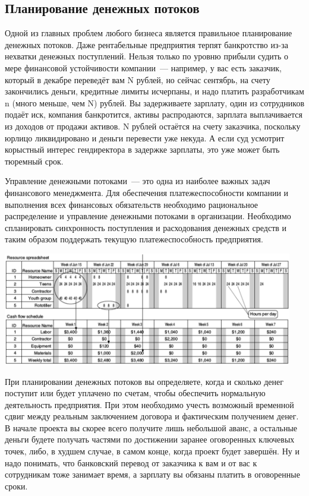 \documentclass{../../text-style}
\begin{document}
\subsection{Планирование денежных потоков}

Одной из главных проблем любого бизнеса является правильное планирование денежных потоков. Даже рентабельные предприятия терпят банкротство из-за нехватки денежных поступлений. Нельзя только по уровню прибыли судить о мере финансовой устойчивости компании~--- например, у вас есть заказчик, который в декабре переведёт вам N рублей, но сейчас сентябрь, на счету закончились деньги, кредитные лимиты исчерпаны, и надо платить разработчикам n (много меньше, чем N) рублей. Вы задерживаете зарплату, один из сотрудников подаёт иск, компания банкротится, активы распродаются, зарплата выплачивается из доходов от продажи активов. N рублей остаётся на счету заказчика, поскольку юрлицо ликвидировано и деньги перевести уже некуда. А если суд усмотрит корыстный интерес гендиректора в задержке зарплаты, это уже может быть тюремный срок.

Управление денежными потоками~--- это одна из наиболее важных задач финансового менеджмента. Для обеспечения платежеспособности компании и выполнения всех финансовых обязательств необходимо рациональное распределение и управление денежными потоками в организации. Необходимо спланировать синхронность поступления и расходования денежных средств и таким образом поддержать текущую платежеспособность предприятия.

\begin{center}
    \includegraphics[width=0.95\textwidth]{cashFlow.png}
\end{center}

При планировании денежных потоков вы определяете, когда и сколько денег поступит или будет уплачено по счетам, чтобы обеспечить нормальную деятельность предприятия. При этом необходимо учесть возможный временной сдвиг между реальным заключением договора и фактическим получением денег. В начале проекта вы скорее всего получите лишь небольшой аванс, а остальные деньги будете получать частями по достижении заранее оговоренных ключевых точек, либо, в худшем случае, в самом конце, когда проект будет завершён. Ну и надо понимать, что банковский перевод от заказчика к вам и от вас к сотрудникам тоже занимает время, а зарплату вы обязаны платить в оговоренные сроки.
\end{document}
